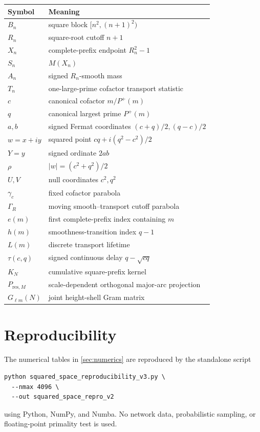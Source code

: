 \documentclass[11pt]{article}
\theoremstyle{definition}
\theoremstyle{remark}
\newcommand{\Pplus}{P^{+}}
\newcommand{\1}{\mathbf{1}}
\begin{document}
\begin{table}[htbp]
\centering
\small
\renewcommand{\arraystretch}{1.25}
\begin{tabular}{ll}
\toprule
Symbol & Meaning\\
\midrule
$B_n$ & square block $[n^2,(n+1)^2)$\\
$R_n$ & square-root cutoff $n+1$\\
$X_n$ & complete-prefix endpoint $R_n^2-1$\\
$S_n$ & $M(X_n)$\\
$A_n$ & signed $R_n$-smooth mass\\
$T_n$ & one-large-prime cofactor transport statistic\\
$c$ & canonical cofactor $m/\Pplus(m)$\\
$q$ & canonical largest prime $\Pplus(m)$\\
$a,b$ & signed Fermat coordinates $(c+q)/2,(q-c)/2$\\
$w=x+iy$ & squared point $cq+i(q^2-c^2)/2$\\
$Y=y$ & signed ordinate $2ab$\\
$\rho$ & $|w|=(c^2+q^2)/2$\\
$U,V$ & null coordinates $c^2,q^2$\\
$\gamma_c$ & fixed cofactor parabola\\
$\Gamma_R$ & moving smooth--transport cutoff parabola\\
$e(m)$ & first complete-prefix index containing $m$\\
$h(m)$ & smoothness-transition index $q-1$\\
$L(m)$ & discrete transport lifetime\\
$\tau(c,q)$ & signed continuous delay $q-\sqrt{cq}$\\
$K_N$ & cumulative square-prefix kernel\\
$P_{\mathrm{res},M}$ & scale-dependent orthogonal major-arc projection\\
$G_{\ell m}(N)$ & joint height-shell Gram matrix\\
\bottomrule
\end{tabular}
\end{table}

\section{Reproducibility}
\label{app:reproducibility}

The numerical tables in \cref{sec:numerics} are reproduced by the
standalone script
\begin{verbatim}
python squared_space_reproducibility_v3.py \
  --nmax 4096 \
  --out squared_space_repro_v2
\end{verbatim}
using Python, NumPy, and Numba.  No network data, probabilistic
sampling, or floating-point primality test is used.
\end{document}

